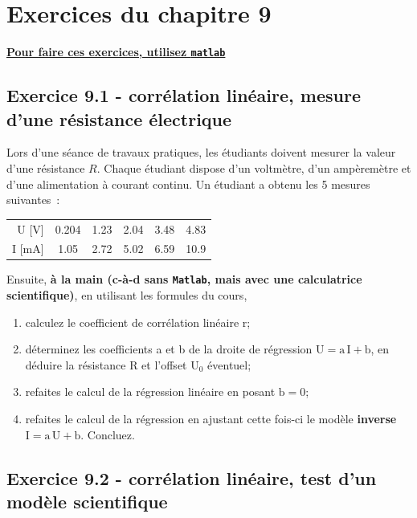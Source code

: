 \newpage

\section{Exercices du chapitre 9}

\begin{center}
\Large \bf {\underline{Pour faire ces exercices, utilisez \texttt{matlab}}}
\end{center}

\subsection*{Exercice 9.1 - corrélation linéaire, mesure d'une résistance électrique}

Lors d'une séance de travaux pratiques, les étudiants doivent mesurer la valeur d'une résistance $R$. Chaque étudiant dispose d'un voltmètre, d'un ampèremètre et d'une alimentation à courant continu. Un étudiant a obtenu les 5 mesures suivantes~:
\begin{center}
\begin{tabular}{r|ccccc}
U [V] & 0.204 & 1.23 & 2.04 & 3.48 & 4.83\\
I [mA] & 1.05 & 2.72 & 5.02 & 6.59 & 10.9
\end{tabular}
\end{center}

Ensuite, \textbf{à la main (c-à-d sans \texttt{Matlab}, mais avec une calculatrice scientifique)}, en utilisant les formules du cours,
\begin{enumerate}
\item calculez le coefficient de corrélation linéaire r;
\item déterminez les coefficients a et b de la droite de régression $\text{U}=\text{a}\,\text{I}+\text{b}$, en déduire la résistance R et l'offset $\text{U}_0$ éventuel;
\item refaites le calcul de la régression linéaire en posant $\text{b}=0$;
\item refaites le calcul de la régression en ajustant cette fois-ci le modèle \textbf{inverse} $\text{I}=\text{a}\,\text{U}+\text{b}$. Concluez.
\end{enumerate}

\subsection*{Exercice 9.2 - corrélation linéaire, test d'un modèle scientifique}

